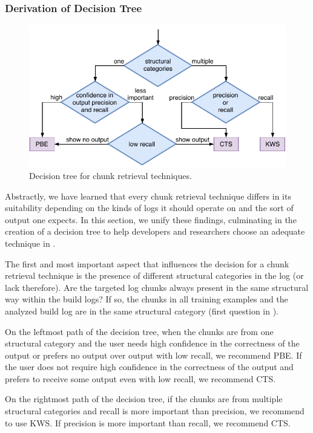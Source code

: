 \documentclass[10pt,journal,compsoc]{IEEEtran}
\begin{document}
\subsubsection{Derivation of Decision Tree}
\begin{figure}[bt]
		\centering
		\includegraphics[width=\columnwidth,
		clip]{img/crt-recommendation.pdf}
		\caption{Decision tree for chunk
		retrieval techniques.}
		\label{fig:crt-recommendation}
\end{figure}

Abstractly, we have learned that every chunk retrieval technique
differs in its suitability depending on the kinds of logs it should
operate on and the sort of output one expects.
In this section, we
unify these findings, culminating in the creation of a decision tree
to help developers and researchers choose an adequate technique in
.

The first and most important aspect that influences the decision for a
chunk retrieval technique is the presence of different structural
categories in the log (or lack therefore).
Are the targeted log
chunks always present in the same structural way
within the build logs? If so, the chunks
in all training examples and the analyzed build log are in the same
structural category (first question in ).

On the leftmost path of the decision tree,
when the chunks are from one structural category and the user
needs high confidence in the correctness of the output or prefers
no output over output with low recall, we recommend PBE\@.
If the user does not
require high confidence in the correctness of the output and prefers
to receive some output even with low recall, we recommend CTS\@.

On the rightmost path of the decision tree,
if the chunks are from multiple structural categories and recall is
more important than precision, we recommend to use KWS\@.
If precision is more important than recall, we
recommend CTS\@.
\end{document}
